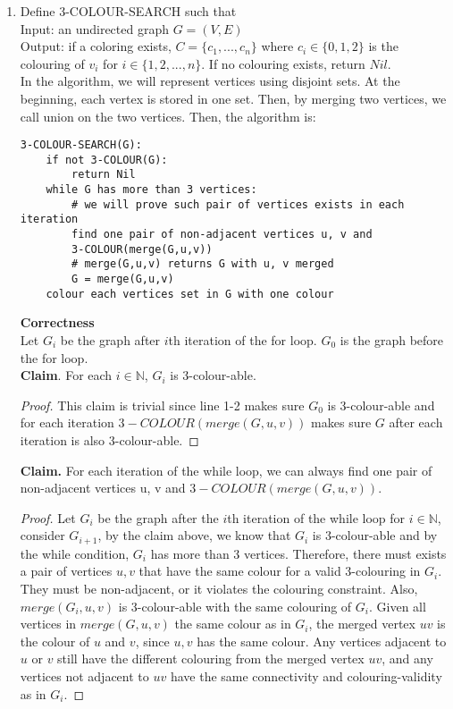 \documentclass[11pt]{article}
\begin{document}
\begin{enumerate}
    \item Define 3-COLOUR-SEARCH such that \\
    Input: an undirected graph $G=(V,E)$\\
    Output: if a coloring exists, $C=\{c_1,...,c_n\}$ where $c_i\in\{0,1,2\}$ is the colouring of $v_i$ for $i\in\{1,2,...,n\}$. If no colouring exists, return $Nil$.  \\
    In the algorithm, we will represent vertices using disjoint sets. At the beginning, each vertex is stored in one set. Then, by merging two vertices, we call union on the two vertices. 
    Then, the algorithm is:
    \begin{lstlisting}
3-COLOUR-SEARCH(G):
    if not 3-COLOUR(G):
        return Nil
    while G has more than 3 vertices:
        # we will prove such pair of vertices exists in each iteration
        find one pair of non-adjacent vertices u, v and 
        3-COLOUR(merge(G,u,v))
        # merge(G,u,v) returns G with u, v merged
        G = merge(G,u,v)
    colour each vertices set in G with one colour
    \end{lstlisting}
    \textbf{Correctness} \\
    Let $G_i$ be the graph after $i$th iteration of the for loop. $G_0$ is the graph before the for loop.\\
    \textbf{Claim}. For each $i\in\mathbb{N}$, $G_i$ is 3-colour-able.
    \begin{proof}
    This claim is trivial since line 1-2 makes sure $G_0$ is 3-colour-able and for each iteration $3-COLOUR(merge(G,u,v))$ makes sure $G$ after each iteration is also 3-colour-able.
    \end{proof}
    \textbf{Claim.} For each iteration of the while loop, we can always find one pair of non-adjacent vertices u, v and $3-COLOUR(merge(G,u,v))$.
    \begin{proof}
    Let $G_i$ be the graph after the $i$th iteration of the while loop for $i\in\mathbb{N}$, consider $G_{i+1}$, by the claim above, we know that $G_i$ is 3-colour-able and by the while condition, $G_i$ has more than 3 vertices. Therefore, there must exists a pair of vertices $u,v$ that have the same colour for a valid 3-colouring in $G_i$. They must be non-adjacent, or it violates the colouring constraint. Also, $merge(G_i,u,v)$ is 3-colour-able with the same colouring of $G_i$. Given all vertices in $merge(G,u,v)$ the same colour as in $G_i$, the merged vertex $uv$ is the colour of $u$ and $v$, since $u,v$ has the same colour. Any vertices adjacent to $u$ or $v$ still have the different colouring from the merged vertex $uv$, and any vertices not adjacent to $uv$ have the same connectivity and colouring-validity as in $G_i$. 

\end{proof}
\end{enumerate}
\end{document}
